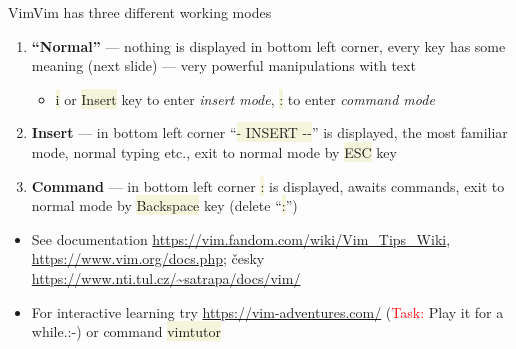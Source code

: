\documentclass[compress, xelatex, 11pt, xcolor=svgnames, aspectratio=169,
	hyperref={
		bookmarks=true,
		unicode=true,
		colorlinks=true,
		pdftitle={Linux, command line and MetaCentrum},
		plainpages=false,
		pdfauthor={Vojtech Zeisek},
		pdfsubject={Course about use of Linux command line, writing shell scripts and using MetaCentrum of CESNET},
		pdfcreator={XeLaTeX},
		pdfkeywords={Linux, GNU, BASH, shell, command line, MetaCentrum},
		linkcolor=DarkRed, %
		anchorcolor=DarkBlue, %
		citecolor=Indigo, %
		filecolor=NavyBlue, %
		menucolor=DarkMagenta, %
		urlcolor=DarkBlue, %
		},
	url={hyphens, lowtilde} %
	]{beamer}
\renewcommand{\texttt}[1]{\colorbox{Beige}{{\ttfamily #1}}}
\renewcommand{\alert}[1]{\textcolor{red}{#1}}
\begin{document}
\begin{frame}{Vim}{Vim has three different working modes}
	\label{vim}
	\begin{enumerate}
		\item \textbf{\enquote{Normal}} --- nothing is displayed in bottom left corner, every key has some meaning (next slide) --- very powerful manipulations with text
		\begin{itemize}
			\item \texttt{i} or \texttt{Insert} key to enter \textit{insert mode}, \texttt{:} to enter \textit{command mode}
		\end{itemize}
		\item \textbf{Insert} --- in bottom left corner \enquote{\texttt{{-}- INSERT -{-}}} is displayed, the most familiar mode, normal typing etc., exit to normal mode by \texttt{ESC} key
		\item \textbf{Command} --- in bottom left corner \texttt{:} is displayed, awaits commands, exit to normal mode by \texttt{Backspace} key (delete \enquote{\texttt{:}})
	\end{enumerate}
	\begin{itemize}
		\item See documentation \url{https://vim.fandom.com/wiki/Vim_Tips_Wiki}, \url{https://www.vim.org/docs.php}; česky \url{https://www.nti.tul.cz/~satrapa/docs/vim/}
		\item For interactive learning try \url{https://vim-adventures.com/} (\alert{Task:} Play it for a while.:-) or command \texttt{vimtutor}
	\end{itemize}
\end{frame}
\end{document}
